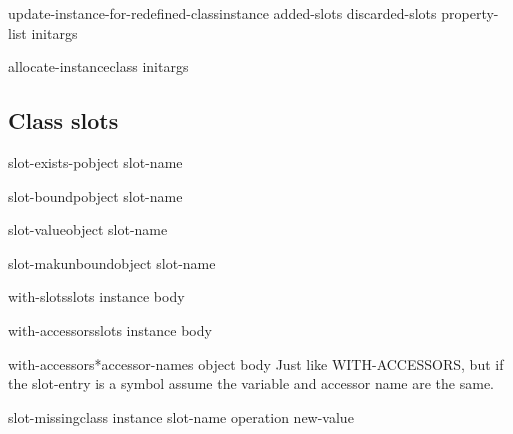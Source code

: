 \documentclass[10pt,english]{book}
\begin{document}
\begin{generic}{update-instance-for-redefined-class}{instance added-slots discarded-slots property-list \rest initargs}
  
\end{generic}

\begin{generic}{allocate-instance}{class \rest initargs}
  
\end{generic}

\subsection{Class slots}
\label{sec:class-slots}

\begin{function}{slot-exists-p}{object slot-name}
  
\end{function}

\begin{function}{slot-boundp}{object slot-name}
  
\end{function}

\begin{function}{slot-value}{object slot-name}
  
\end{function}

\begin{function}{slot-makunbound}{object slot-name}
  
\end{function}

\begin{macro}{with-slots}{slots instance \body body}
  
\end{macro}

\begin{macro}{with-accessors}{slots instance \body body}
  
\end{macro}

\begin{macro}{with-accessors*}{accessor-names object \body body}
  Just like WITH-ACCESSORS, but if the slot-entry is a symbol assume
  the variable and accessor name are the same.
\end{macro}

\begin{generic}{slot-missing}{class instance slot-name operation \op new-value}
  
\end{generic}
\end{document}
